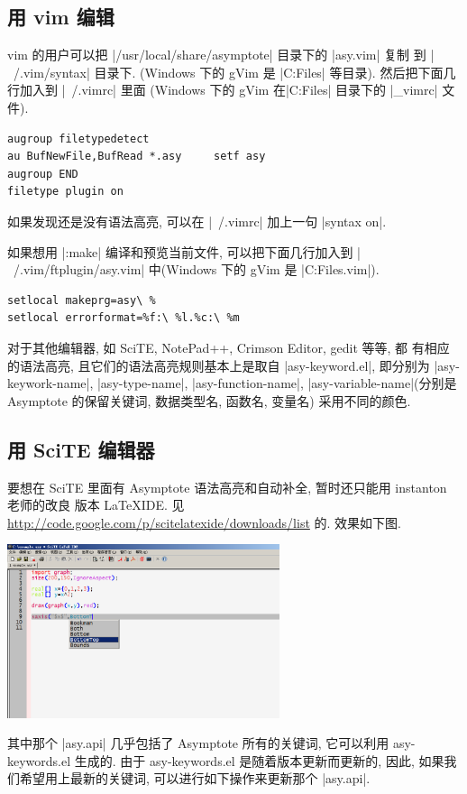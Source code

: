 \documentclass{ctexbook}
\begin{document}
\subsection{用 vim 编辑}
vim 的用户可以把 |/usr/local/share/asymptote| 目录下的 |asy.vim| 复制
到 |~/.vim/syntax| 目录下. (Windows 下的 gVim 是
|C:\Program Files\Vim\vimfiles\syntax| 等目录). 然后把下面几行加入到
|~/.vimrc| 里面 (Windows 下的 gVim 在|C:\Program Files\Vim| 目录下的
|_vimrc| 文件).
\begin{verbatim}
augroup filetypedetect
au BufNewFile,BufRead *.asy     setf asy
augroup END
filetype plugin on
\end{verbatim}
如果发现还是没有语法高亮, 可以在 |~/.vimrc| 加上一句 |syntax on|.

如果想用 |:make| 编译和预览当前文件, 可以把下面几行加入到
|~/.vim/ftplugin/asy.vim| 中(Windows 下的 gVim 是
|C:\Program Files\Vim\vimfiles\ftplugin\asy.vim|).
\begin{verbatim}
setlocal makeprg=asy\ %
setlocal errorformat=%f:\ %l.%c:\ %m
\end{verbatim}

对于其他编辑器, 如 SciTE, NotePad++, Crimson Editor, gedit 等等, 都
有相应的语法高亮, 且它们的语法高亮规则基本上是取自 |asy-keyword.el|,
即分别为 |asy-keywork-name|, |asy-type-name|, |asy-function-name|,
|asy-variable-name|(分别是 Asymptote 的保留关键词, 数据类型名, 函数名,
变量名) 采用不同的颜色.

\subsection{用 SciTE 编辑器}
要想在 SciTE 里面有 Asymptote 语法高亮和自动补全, 暂时还只能用 instanton 老师的改良
版本 LaTeXIDE. 见
\url{http://code.google.com/p/scitelatexide/downloads/list}
的. 效果如下图.
\begin{center}
  \includegraphics[width=0.6\textwidth]{SciTE.png}
\end{center}
其中那个 |asy.api| 几乎包括了 Asymptote 所有的关键词, 它可以利用
asy-keywords.el 生成的. 由于 asy-keywords.el 是随着版本更新而更新的,
因此, 如果我们希望用上最新的关键词, 可以进行如下操作来更新那个
|asy.api|.
\end{document}

